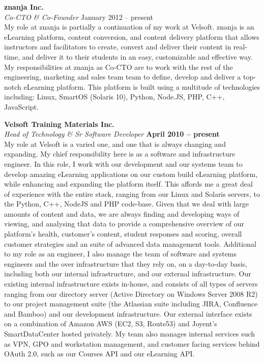 \documentclass[margin,line]{resume}
\begin{document}
\begin{resume}
	{\bf znanja Inc.} \vspace{2mm}\\\vspace{1mm}
	{\sl Co-CTO \& Co-Founder} \hfill {January 2012 -- present}
	\\
		My role at znanja is partially a continuation of my work at Velsoft. znanja is an eLearning platform, content conversion, and content delivery platform that allows instructors and facilitators to create, convert and deliver their content in real-time, and deliver it to their students in an easy, customizable and effective way. My responsibilities at znanja as Co-CTO are to work with the rest of the engineering, marketing and sales team team to define, develop and deliver a top-notch eLearning platform. This platform is built using a multitude of technologies including: Linux, SmartOS (Solaris 10), Python, Node.JS, PHP, C++, JavaScript.

	{\bf Velsoft Training Materials Inc.} \vspace{2mm}\\\vspace{1mm}
	{\sl Head of Technology \& Sr Software Developer} \hfill {\bf April 2010 -- present}
	\\
		My role at Velsoft is a varied one, and one that is always changing and expanding. My chief responsibility here is as a software and infrastructure engineer. In this role, I work with our development and our systems team to develop amazing eLearning applications on our custom build eLearning platform, while enhancing and expanding the platform itself. This affords me a great deal of experience with the entire stack, ranging from our Linux and Solaris servers, to the Python, C++, NodeJS and PHP code-base. Given that we deal with large amounts of content and data, we are always finding and developing ways of viewing, and analysing that data to provide a comprehensive overview of our platform's health, customer's content, student responses and scoring, overall customer strategies and an suite of advanced data management tools.
\newpage
		Additional to my role as an engineer, I also manage the team of software and systems engineers and the over infrastructure that they rely on, on a day-to-day basis, including both our internal infrastructure, and our external infrastructure. Our existing internal infrastructure exists in-house, and consists of all types of servers ranging from our directory server (Active Directory on Windows Server 2008 R2) to our project management suite (the Atlassian suite including JIRA, Confluence and Bamboo) and our development infrastructure. Our external interface exists on a combination of Amazon AWS (EC2, S3, Route53) and Joyent's SmartDataCenter hosted privately. My team also manages internal services such as VPN, GPO and workstation management, and customer facing services behind OAuth 2.0, such as our Courses API and our eLearning API.


\end{resume}
\end{document}
